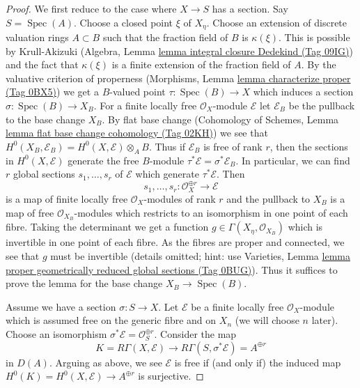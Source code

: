 \documentclass{amsart}
\theoremstyle{plain}
\theoremstyle{definition}
\theoremstyle{remark}
\numberwithin{equation}{subsection}
\def\Spec{\mathop{\mathrm{Spec}}}
\begin{document}
\begin{proof}
We first reduce to the case where $X \to S$ has a section. Say $S = \Spec(A)$.
Choose a closed point $\xi$ of $X_\eta$. Choose an extension
of discrete valuation rings $A \subset B$ such that the fraction field
of $B$ is $\kappa(\xi)$. This is possible by Krull-Akizuki
(Algebra, Lemma \href{https://stacks.math.columbia.edu/tag/09IG}{lemma integral closure Dedekind (Tag 09IG)})
and the fact that $\kappa(\xi)$ is a finite extension of the
fraction field of $A$.
By the valuative criterion of properness
(Morphisms, Lemma \href{https://stacks.math.columbia.edu/tag/0BX5}{lemma characterize proper (Tag 0BX5)})
we get a $B$-valued point $\tau : \Spec(B) \to X$
which induces a section $\sigma : \Spec(B) \to X_B$.
For a finite locally free $\mathcal{O}_X$-module $\mathcal{E}$
let $\mathcal{E}_B$ be the pullback to the base change $X_B$.
By flat base change
(Cohomology of Schemes, Lemma \href{https://stacks.math.columbia.edu/tag/02KH}{lemma flat base change cohomology (Tag 02KH)})
we see that $H^0(X_B, \mathcal{E}_B) = H^0(X, \mathcal{E}) \otimes_A B$.
Thus if $\mathcal{E}_B$ is free of rank $r$, then the sections in
$H^0(X, \mathcal{E})$ generate the free $B$-module
$\tau^*\mathcal{E} = \sigma^*\mathcal{E}_B$.
In particular, we can find $r$ global sections $s_1, \ldots, s_r$
of $\mathcal{E}$ which generate $\tau^*\mathcal{E}$. Then
$$
s_1, \ldots, s_r :
\mathcal{O}_X^{\oplus r}
\longrightarrow
\mathcal{E}
$$
is a map of finite locally free $\mathcal{O}_X$-modules of rank $r$
and the pullback to $X_B$ is a map of free $\mathcal{O}_{X_B}$-modules
which restricts to an isomorphism in one point of each fibre.
Taking the determinant we get a function
$g \in \Gamma(X_\eta, \mathcal{O}_{X_B})$
which is invertible in one point of each fibre.
As the fibres are proper and connected, we see that $g$
must be invertible (details omitted; hint: use Varieties, Lemma
\href{https://stacks.math.columbia.edu/tag/0BUG}{lemma proper geometrically reduced global sections (Tag 0BUG)}).
Thus it suffices to prove the lemma for the base change $X_B \to \Spec(B)$.

\medskip\noindent
Assume we have a section $\sigma : S \to X$. Let $\mathcal{E}$
be a finite locally free $\mathcal{O}_X$-module which is assumed
free on the generic fibre and on $X_n$ (we will choose $n$ later).
Choose an isomorphism $\sigma^*\mathcal{E} = \mathcal{O}_S^{\oplus r}$.
Consider the map
$$
K = R\Gamma(X, \mathcal{E}) \longrightarrow
R\Gamma(S, \sigma^*\mathcal{E}) = A^{\oplus r}
$$
in $D(A)$. Arguing as above, we see $\mathcal{E}$ is free if (and only if)
the induced map $H^0(K) = H^0(X, \mathcal{E}) \to A^{\oplus r}$ is surjective.


\end{proof}
\end{document}
